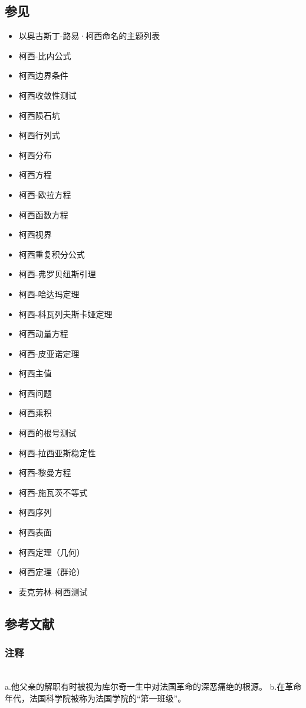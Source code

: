\subsection{参见}
\begin{itemize}
\item 以奥古斯丁-路易·柯西命名的主题列表
\item 柯西-比内公式
\item 柯西边界条件
\item 柯西收敛性测试
\item 柯西陨石坑
\item 柯西行列式
\item 柯西分布
\item 柯西方程
\item 柯西-欧拉方程
\item 柯西函数方程
\item 柯西视界
\item 柯西重复积分公式
\item 柯西-弗罗贝纽斯引理
\item 柯西-哈达玛定理
\item 柯西-科瓦列夫斯卡娅定理
\item 柯西动量方程
\item 柯西-皮亚诺定理
\item 柯西主值
\item 柯西问题
\item 柯西乘积
\item 柯西的根号测试
\item 柯西-拉西亚斯稳定性
\item 柯西-黎曼方程
\item 柯西-施瓦茨不等式
\item 柯西序列
\item 柯西表面
\item 柯西定理（几何）
\item 柯西定理（群论）
\item 麦克劳林-柯西测试
\end{itemize}
\subsection{参考文献}
\subsubsection{注释}\\
a.他父亲的解职有时被视为库尔奇一生中对法国革命的深恶痛绝的根源。
b.在革命年代，法国科学院被称为法国学院的“第一班级”。
